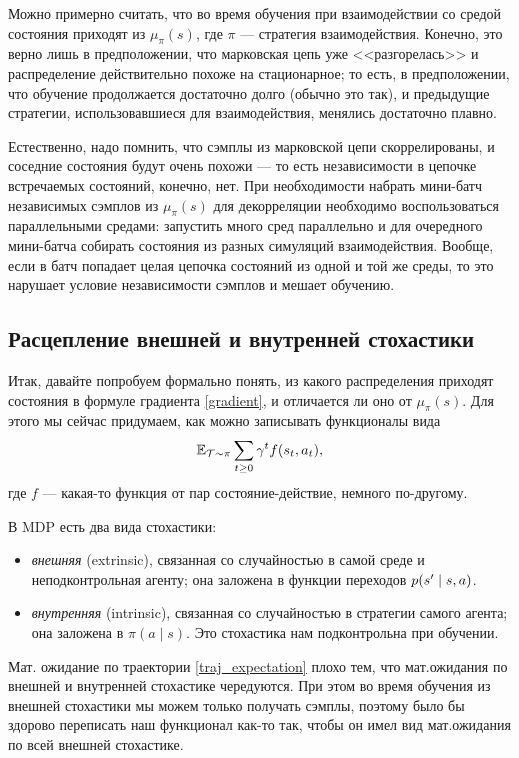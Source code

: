 Можно примерно считать, что во время обучения при взаимодействии со средой состояния приходят из $\mu_{\pi}(s)$, где $\pi$ --- стратегия взаимодействия. Конечно, это верно лишь в предположении, что марковская цепь уже <<разгорелась>> и распределение действительно похоже на стационарное; то есть, в предположении, что обучение продолжается достаточно долго (обычно это так), и предыдущие стратегии, использовавшиеся для взаимодействия, менялись достаточно плавно. 

Естественно, надо помнить, что сэмплы из марковской цепи скоррелированы, и соседние состояния будут очень похожи --- то есть независимости в цепочке встречаемых состояний, конечно, нет. При необходимости набрать мини-батч независимых сэмплов из $\mu_{\pi}(s)$ для декорреляции необходимо воспользоваться параллельными средами: запустить много сред параллельно и для очередного мини-батча собирать состояния из разных симуляций взаимодействия. Вообще, если в батч попадает целая цепочка состояний из одной и той же среды, то это нарушает условие независимости сэмплов и мешает обучению. 

\subsection{Расцепление внешней и внутренней стохастики}

Итак, давайте попробуем формально понять, из какого распределения приходят состояния в формуле градиента \eqref{gradient}, и отличается ли оно от $\mu_{\pi}(s)$. Для этого мы сейчас придумаем, как можно записывать функционалы вида
$$\mathbb{E}_{\mathcal{T} \sim \pi} \sum_{t \ge 0} \gamma^t f(s_t, a_t),$$
где $f$ --- какая-то функция от пар состояние-действие, немного по-другому.

В MDP есть два вида стохастики:
\begin{itemize}
    \item \emph{внешняя} (extrinsic), связанная со случайностью в самой среде и неподконтрольная агенту; она заложена в функции переходов $p(s' \HM\mid s, a)$.
    \item \emph{внутренняя} (intrinsic), связанная со случайностью в стратегии самого агента; она заложена в $\pi(a \mid s)$. Это стохастика нам подконтрольна при обучении.
\end{itemize}

Мат. ожидание по траектории \eqref{traj_expectation} плохо тем, что мат.ожидания по внешней и внутренней стохастике чередуются. При этом во время обучения из внешней стохастики мы можем только получать сэмплы, поэтому было бы здорово переписать наш функционал как-то так, чтобы он имел вид мат.ожидания по всей внешней стохастике.

